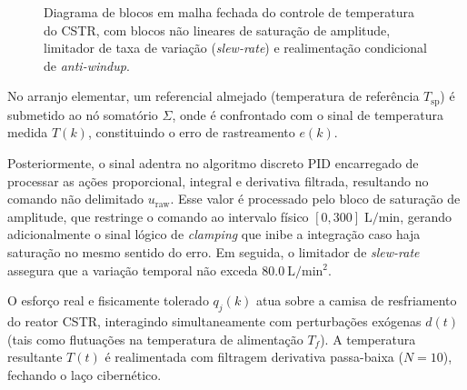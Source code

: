 \begin{figure}[htbp]
{%
}
\caption{Diagrama de blocos em malha fechada do controle de temperatura do CSTR, com blocos não lineares de saturação de amplitude, limitador de taxa de variação (\textit{slew-rate}) e realimentação condicional de \textit{anti-windup}.}
\label{fig:diagrama_blocos}
\end{figure}

No arranjo elementar, um referencial almejado (temperatura de referência $T_{\text{sp}}$) é submetido ao nó somatório $\Sigma$, onde é confrontado com o sinal de temperatura medida $T(k)$, constituindo o erro de rastreamento $e(k)$. 

Posteriormente, o sinal adentra no algoritmo discreto PID encarregado de processar as ações proporcional, integral e derivativa filtrada, resultando no comando não delimitado $u_{\text{raw}}$. Esse valor é processado pelo bloco de saturação de amplitude, que restringe o comando ao intervalo físico $[0, 300]\;\si{\liter\per\minute}$, gerando adicionalmente o sinal lógico de \textit{clamping} que inibe a integração caso haja saturação no mesmo sentido do erro. Em seguida, o limitador de \textit{slew-rate} assegura que a variação temporal não exceda $\SI{80.0}{\liter\per\minute\squared}$.

O esforço real e fisicamente tolerado $q_j(k)$ atua sobre a camisa de resfriamento do reator CSTR, interagindo simultaneamente com perturbações exógenas $d(t)$ (tais como flutuações na temperatura de alimentação $T_f$). A temperatura resultante $T(t)$ é realimentada com filtragem derivativa passa-baixa ($N=10$), fechando o laço cibernético.
